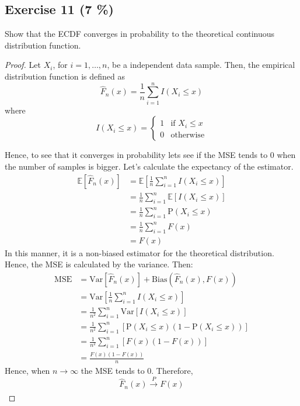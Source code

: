 \documentclass[11pt]{article}
\theoremstyle{definition}
\theoremstyle{remark}
\theoremstyle{remark}
\newcommand{\E}[1]{\mathbb{E}\left[#1 \right]}
\newcommand{\V}[1]{\mathrm{Var}\left[#1 \right]}
\renewcommand{\P}[1]{\mathrm{P}\left(#1 \right)}
\begin{document}
\subsection*{Exercise 11 (7 \%)}
Show that the ECDF converges in probability to the theoretical
continuous distribution function.
\begin{proof}
  Let $X_i$, for $i=1,\ldots,n$, be a independent data sample. Then,
  the empirical distribution function is defined as
  \begin{equation*}
    \hat{F}_n(x) = \frac{1}{n} \sum_{i=1}^nI(X_i \le x)
  \end{equation*}
  where
  \begin{equation*}
    I(X_i \le x) =
    \begin{cases}
      1 &\text{if } X_i \le x \\
      0 &\text{otherwise}
    \end{cases}
  \end{equation*}

  Hence, to see that it converges in probability lets see if the MSE
  tends to 0 when the number of samples is bigger. Let's calculate the
  expectancy of the estimator.
  \begin{align*}
    \E{\hat{F}_n(x)} &= \E{\frac{1}{n}\sum_{i=1}^nI(X_i \le x)} \\
                     &=\frac{1}{n}\sum_{i=1}^n \E{I(X_i \le x)} \\
                     &= \frac{1}{n} \sum_{i=1}^n \P{X_i \le x} \\
                     &= \frac{1}{n} \sum_{i=1}^nF(x) \\
                     &= F(x)
  \end{align*}
  In this manner, it is a non-biased estimator for the theoretical
  distribution. Hence, the MSE is calculated by the variance. Then:
  \begin{align*}
    \mathrm{MSE} &= \V{\hat{F}_n(x)} + \mathrm{Bias}\left(\hat{F}_n(x), F(x)\right)\\
                 &= \V{\frac{1}{n} \sum_{i=1}^n I(X_i \le x)} \\
                 &= \frac{1}{n^2} \sum_{i=1}^n \V{I(X_i \le x)} \\
                 &= \frac{1}{n^2} \sum_{i=1}^n \left[\P{X_i \le x}(1 - \P{X_i \le x})\right] \\
                 &= \frac{1}{n^2} \sum_{i=1}^n \left[F(x)(1 - F(x))\right] \\
                 &= \frac{F(x)(1 - F(x))}{n}
  \end{align*}
  Hence, when $n \rightarrow \infty$ the MSE tends to 0. Therefore,
  \begin{equation*}
    \hat{F}_n(x) \xrightarrow[]{P} F(x)
  \end{equation*}
\end{proof}
\end{document}
